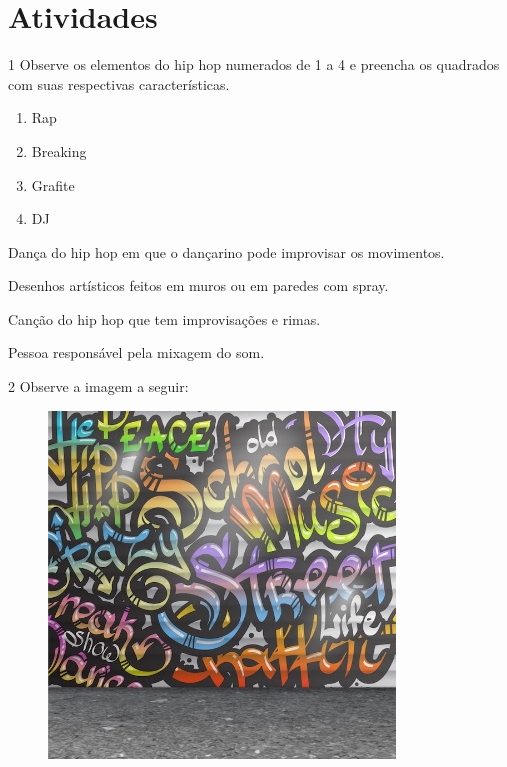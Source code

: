 \section*{Atividades}

\num{1} Observe os elementos do hip hop numerados de 1 a 4 e preencha os quadrados com suas respectivas características.

\begin{multicols}{2}
\begin{enumerate}
\item Rap

\item Breaking

\item Grafite

\item DJ
\end{enumerate}
\end{multicols}

\begin{boxlist}
 Dança do hip hop em que o dançarino pode improvisar os movimentos.

 Desenhos artísticos feitos em muros ou em paredes com spray.

 Canção do hip hop que tem improvisações e rimas.

 Pessoa responsável pela mixagem do som.
\end{boxlist}

\pagebreak
\num{2} Observe a imagem a seguir:

\begin{figure}[htpb!]
\centering
\includegraphics[width=.8\textwidth]{./imgs/img3.jpg}
\end{figure}

